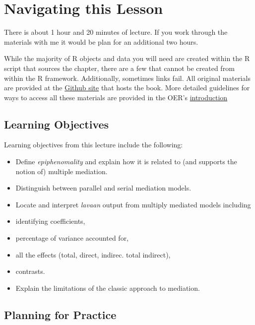 \documentclass[
  11pt,
]{book}
\providecommand{\tightlist}{%
  \setlength{\itemsep}{0pt}\setlength{\parskip}{0pt}}
\begin{document}
\hypertarget{navigating-this-lesson-5}{%
\section{Navigating this Lesson}\label{navigating-this-lesson-5}}

There is about 1 hour and 20 minutes of lecture. If you work through the materials with me it would be plan for an additional two hours.

While the majority of R objects and data you will need are created within the R script that sources the chapter, there are a few that cannot be created from within the R framework. Additionally, sometimes links fail. All original materials are provided at the \href{https://https://github.com/lhbikos/ReC_MultivModel}{Github site} that hosts the book. More detailed guidelines for ways to access all these materials are provided in the OER's \protect\hyperlink{ReCintro}{introduction}

\hypertarget{learning-objectives-5}{%
\subsection{Learning Objectives}\label{learning-objectives-5}}

Learning objectives from this lecture include the following:

\begin{itemize}
\tightlist
\item
  Define \emph{epiphenomality} and explain how it is related to (and supports the notion of) multiple mediation.
\item
  Distinguish between parallel and serial mediation models.
\item
  Locate and interpret \emph{lavaan} output from multiply mediated models including
\item
  identifying coefficients,
\item
  percentage of variance accounted for,\\
\item
  all the effects (total, direct, indirec. total indirect),
\item
  contrasts.
\item
  Explain the limitations of the classic approach \citep{baron_moderator-mediator_1986} to mediation.
\end{itemize}

\hypertarget{planning-for-practice-5}{%
\subsection{Planning for Practice}\label{planning-for-practice-5}}
\end{document}
